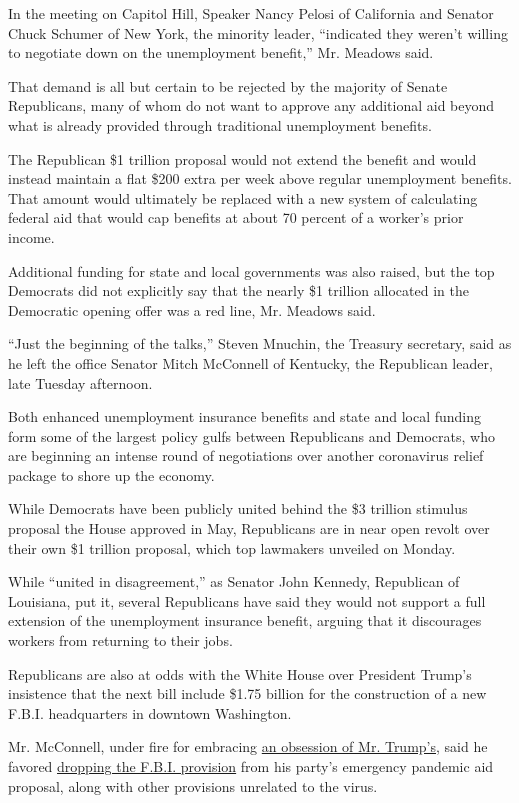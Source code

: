In the meeting on Capitol Hill, Speaker Nancy Pelosi of California and
Senator Chuck Schumer of New York, the minority leader, ``indicated they
weren't willing to negotiate down on the unemployment benefit,'' Mr.
Meadows said.

That demand is all but certain to be rejected by the majority of Senate
Republicans, many of whom do not want to approve any additional aid
beyond what is already provided through traditional unemployment
benefits.

The Republican \$1 trillion proposal would not extend the benefit and
would instead maintain a flat \$200 extra per week above regular
unemployment benefits. That amount would ultimately be replaced with a
new system of calculating federal aid that would cap benefits at about
70 percent of a worker's prior income.

Additional funding for state and local governments was also raised, but
the top Democrats did not explicitly say that the nearly \$1 trillion
allocated in the Democratic opening offer was a red line, Mr. Meadows
said.

``Just the beginning of the talks,'' Steven Mnuchin, the Treasury
secretary, said as he left the office Senator Mitch McConnell of
Kentucky, the Republican leader, late Tuesday afternoon.

Both enhanced unemployment insurance benefits and state and local
funding form some of the largest policy gulfs between Republicans and
Democrats, who are beginning an intense round of negotiations over
another coronavirus relief package to shore up the economy.

While Democrats have been publicly united behind the \$3 trillion
stimulus proposal the House approved in May, Republicans are in near
open revolt over their own \$1 trillion proposal, which top lawmakers
unveiled on Monday.

While ``united in disagreement,'' as Senator John Kennedy, Republican of
Louisiana, put it, several Republicans have said they would not support
a full extension of the unemployment insurance benefit, arguing that it
discourages workers from returning to their jobs.

Republicans are also at odds with the White House over President Trump's
insistence that the next bill include \$1.75 billion for the
construction of a new F.B.I. headquarters in downtown Washington.

Mr. McConnell, under fire for embracing
\href{https://www.nytimes3xbfgragh.onion/2018/10/18/us/politics/fbi-headquarters-building-trump.html}{an
obsession of Mr. Trump's}, said he favored
\href{https://www.nytimes3xbfgragh.onion/2020/07/28/us/politics/republicans-trump-fbi-building-virus-relief-bill.html}{dropping
the F.B.I. provision} from his party's emergency pandemic aid proposal,
along with other provisions unrelated to the virus.

